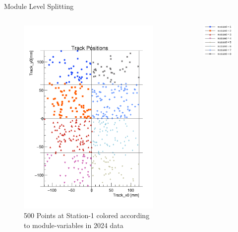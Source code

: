 \begin{frame}{Module Level Splitting}
    \begin{columns}
        \begin{column}{1.2\linewidth}
            \begin{figure}
                \centering
                \includegraphics[height=0.8\textheight]{./ModuleLevelPlots/Positions_st0_truemodule0.pdf}
                \caption{500 Points at Station-1 colored according to module-variables in 2024 data}
            \end{figure}
        \end{column}
        \begin{column}{0.2\linewidth}
            \begin{figure}
                \hspace{-7cm}\includegraphics[scale=0.25]{./assets/image.png}

\end{figure}
\end{column}
\end{columns}
\end{frame}
